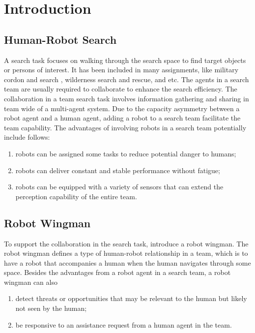 \section{Introduction}
\label{sec:introduction}

\subsection{Human-Robot Search}
\label{subsec:cordon_and_search}

A search task focuses on walking through the search space to find target objects or persons of interest.
It has been included in many assignments, like military cordon and search \cite{waggener2010air}, wilderness search and rescue, and etc.  
The agents in a search team are usually required to collaborate to enhance the search efficiency.
The collaboration in a team search task involves information gathering and sharing in team wide of a multi-agent system.
Due to the capacity asymmetry between a robot agent and a human agent, adding a robot to a search team facilitate the team capability. 
The advantages of involving robots in a search team potentially include follows:
\begin{enumerate}
\item robots can be assigned some tasks to reduce potential danger to humans;
\item robots can deliver constant and stable performance without fatigue; 
\item robots can be equipped with a variety of sensors that can extend the perception capability of the entire team.
\end{enumerate}

\subsection{Robot Wingman}
\label{subsec:robot_wingman}

To support the collaboration in the search task, \cite{goodrich2013toward} introduce a robot wingman. 
The robot wingman defines a type of human-robot relationship in a team, which is to have a robot that accompanies a human when the human navigates through some space.
Besides the advantages from a robot agent in a search team, a robot wingman can also
\begin{enumerate}
\item detect threats or opportunities that may be relevant to the human but likely not seen by the human;
\item be responsive to an assistance request from a human agent in the team. 
\end{enumerate}

